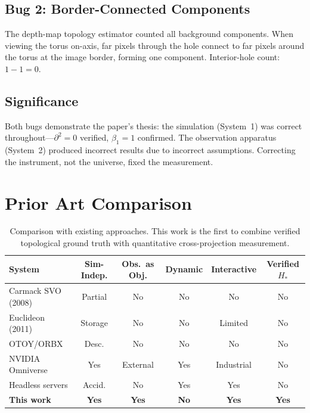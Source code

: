 \documentclass[11pt,a4paper]{article}
\theoremstyle{remark}
\begin{document}
\subsection{Bug 2: Border-Connected Components}

The depth-map topology estimator counted all background components. When viewing the torus on-axis, far pixels through the hole connect to far pixels around the torus at the image border, forming one component. Interior-hole count: $1 - 1 = 0$.

\subsection{Significance}

Both bugs demonstrate the paper's thesis: the simulation (System~1) was correct throughout---$\partial^2 = 0$ verified, $\beta_1 = 1$ confirmed. The observation apparatus (System~2) produced incorrect results due to incorrect assumptions. Correcting the instrument, not the universe, fixed the measurement.

\section{Prior Art Comparison}
\label{app:priorart}

\begin{table}[H]
\centering
\caption{Comparison with existing approaches. This work is the first to combine verified topological ground truth with quantitative cross-projection measurement.}
\label{tab:priorart}
\footnotesize
\begin{tabular}{lccccc}
\toprule
\textbf{System} & \textbf{Sim-Indep.} & \textbf{Obs.\ as Obj.} & \textbf{Dynamic} & \textbf{Interactive} & \textbf{Verified $H_*$} \\
\midrule
Carmack SVO (2008) & Partial & No & No & No & No \\
Euclideon (2011) & Storage & No & No & Limited & No \\
OTOY/ORBX & Desc. & No & No & No & No \\
NVIDIA Omniverse & Yes & External & Yes & Industrial & No \\
Headless servers & Accid. & No & Yes & Yes & No \\
\textbf{This work} & \textbf{Yes} & \textbf{Yes} & \textbf{No} & \textbf{Yes} & \textbf{Yes} \\
\bottomrule
\end{tabular}
\end{table}
\end{document}
